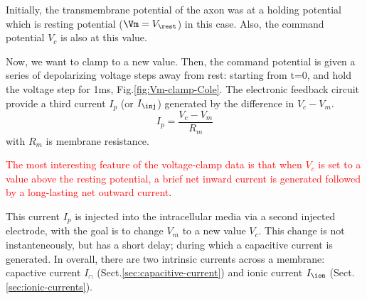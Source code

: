Initially, the transmembrane potential of the axon was at a holding potential
which is resting potential ($\Vm=V_\rest$) in this case. Also, the command
potential $V_c$ is also at this value.

Now, we want to clamp to a new value. Then, the command potential is given a
series of depolarizing voltage steps away from rest: starting from t=0, and hold
the voltage step for 1ms, Fig.\ref{fig:Vm-clamp-Cole}. The electronic feedback
circuit provide a third current $I_p$ (or $I_\inj$) generated by the difference
in $V_c-V_m$.
\begin{equation}
I_p = \frac{V_c - V_m}{R_m}
\end{equation}
with $R_m$ is membrane resistance.

\textcolor{red}{The most interesting feature of the voltage-clamp data is that
when $V_c$ is set to a value above the resting potential, a brief net inward
current is generated followed by a long-lasting net outward current}.


This current $I_p$ is injected into the intracellular media via a second
injected electrode, with the goal is to change $V_m$ to a new value $V_c$. This
change is not instanteneously, but has a short delay; during which a capacitive
current is generated. In overall, there are two intrinsic currents across a
membrane: capactive current $I_\cap$ (Sect.\ref{sec:capacitive-current}) and
ionic current $I_\ion$ (Sect.\ref{sec:ionic-currents}).

